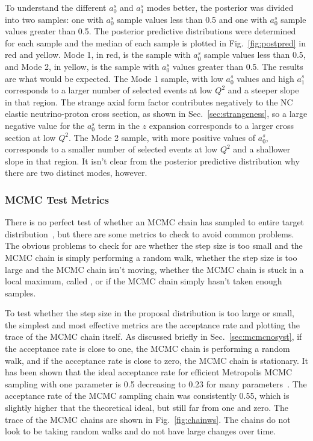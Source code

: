     To understand the different $a_0^s$ and $a_1^s$ modes better, the posterior
    was divided into two samples: one with $a_0^s$ sample values less than 0.5
    and one with $a_0^s$ sample values greater than 0.5. The posterior
    predictive distributions were determined for each sample and the median of
    each sample is plotted in Fig.~\ref{fig:postpred} in red and yellow. Mode
    1, in red, is the sample with $a_0^s$ sample values less than 0.5, and Mode
    2, in yellow, is the sample with $a_0^s$ values greater than 0.5. The
    results are what would be expected. The Mode 1 sample, with low $a_0^s$
    values and high $a_1^s$ corresponds to a larger number of selected events
    at low $Q^2$ and a steeper slope in that region. The strange axial form
    factor contributes negatively to the NC elastic neutrino-proton cross
    section, as shown in Sec.~\ref{sec:strangeness}, so a large negative value
    for the $a_0^s$ term in the $z$ expansion corresponds to a larger cross
    section at low $Q^2$. The Mode 2 sample, with more positive values of
    $a_0^s$, corresponds to a smaller number of selected events at low $Q^2$
    and a shallower slope in that region. It isn't clear from the posterior
    predictive distribution why there are two distinct modes, however.

  \subsubsection{MCMC Test Metrics}
    There is no perfect test of whether an MCMC chain has sampled to entire
    target distribution~\cite{Brooks:2011}, but there are some metrics to check
    to avoid common problems. The obvious problems to check for are whether the
    step size is too small and the MCMC chain is simply performing a random
    walk, whether the step size is too large and the MCMC chain isn't moving,
    whether the MCMC chain is stuck in a local maximum, called
    , or if the MCMC chain simply hasn't taken enough
    samples.

    To test whether the step size in the proposal distribution is too large or
    small, the simplest and most effective metrics are the acceptance rate and
    plotting the trace of the MCMC chain itself. As discussed briefly in
    Sec.~\ref{sec:mcmcnosyst}, if the acceptance rate is close to one, the MCMC
    chain is performing a random walk, and if the acceptance rate is close to
    zero, the MCMC chain is stationary. It has been shown that the ideal
    acceptance rate for efficient Metropolis MCMC sampling with one parameter
    is 0.5 decreasing to 0.23 for many parameters~\cite{Roberts:1997}. The
    acceptance rate of the MCMC sampling chain was consistently 0.55, which is
    slightly higher that the theoretical ideal, but still far from one and
    zero. The trace of the MCMC chains are shown in Fig.~\ref{fig:chainws}. The
    chains do not look to be taking random walks and do not have large changes
    over time.

